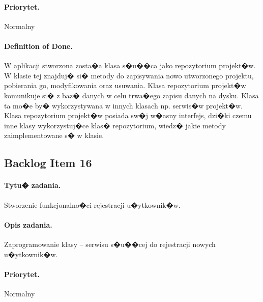 ﻿\documentclass[a4paper]{article}
\begin{document}
\paragraph{Priorytet.} Normalny
\paragraph{Definition of Done.} W aplikacji stworzona zosta�a klasa s�u��ca jako repozytorium projekt�w. W klasie tej znajduj� si� metody do zapisywania nowo utworzonego projektu, pobierania go, modyfikowania oraz usuwania. Klasa repozytorium projekt�w komunikuje si� z baz� danych w celu trwa�ego zapisu danych na dysku. Klasa ta mo�e by� wykorzystywana w innych klasach np. serwis�w projekt�w. Klasa repozytorium projekt�w posiada sw�j w�asny interfejs, dzi�ki czemu inne klasy wykorzystuj�ce klas� repozytorium, wiedz� jakie metody zaimplementowane s� w klasie.

\subsection{Backlog Item 16} 
\paragraph{Tytu� zadania.} Stworzenie funkcjonalno�ci rejestracji u�ytkownik�w. 
\paragraph{Opis zadania.} Zaprogramowanie klasy -- serwisu s�u��cej do rejestracji nowych u�ytkownik�w. 
\paragraph{Priorytet.} Normalny
\end{document}
